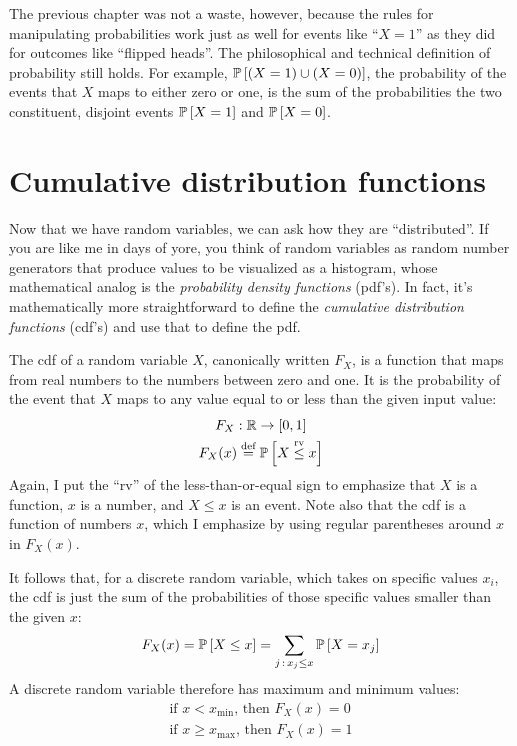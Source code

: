 The previous chapter was not a waste, however, because the rules for
manipulating probabilities work just as well for events like ``$X =
1$'' as they did for outcomes like ``flipped heads''. The philosophical and technical
definition of probability still holds. For example, $\mathbb{P}\left[{(X = 1) \cup (X =
0)}\right]$, the probability of the events that $X$ maps to either zero or one,
is the sum of the probabilities
the two constituent, disjoint events $\mathbb{P}\left[{X=1}\right]$ and $\mathbb{P}\left[{X=0}\right]$.

\section{Cumulative distribution functions}

Now that we have random variables, we can ask how they are ``distributed''. If
you are like me in days of yore, you think of random variables as random
number generators that produce values to be visualized as a histogram, whose
mathematical analog is the \emph{probability density functions} (pdf's).
In fact, it's mathematically more straightforward to define the
\emph{cumulative distribution functions} (cdf's) and use that to define the pdf.

The cdf of a random variable $X$, canonically written $F_X$, is a function that
maps from real numbers to the numbers between zero and one. It is the
probability of the event that $X$ maps to any value equal to or less than the
given input value:
\begin{gather*}
F_X : \mathbb{R} \to [0, 1] \\
F_X(x) \stackrel{\text{def}}{=} \mathbb{P}\left[{X \stackrel{\mathrm{rv}}{\leq} x}\right]
\end{gather*}
Again, I put the ``rv'' of the less-than-or-equal sign to emphasize that $X$ is
a function, $x$ is a number, and $X \leq x$ is an event.
Note also that the cdf is a function of numbers $x$, which I emphasize by using
regular parentheses around $x$ in $F_X(x)$.

It follows that, for a discrete random variable, which takes on specific values
$x_i$, the cdf is
just the sum of the probabilities of those specific values smaller than the
given $x$:
\begin{equation*}
F_X(x) = \mathbb{P}\left[{X \leq x}\right] = \sum_{j \,:\, x_j \leq x} \mathbb{P}\left[{X = x_j}\right]
\end{equation*}
A discrete random variable therefore has maximum and minimum values:
\begin{gather*}
\text{if } x < x_\mathrm{min} \text{, then } F_X(x) = 0 \\
\text{if } x \geq x_\mathrm{max} \text{, then } F_X(x) = 1
\end{gather*}

